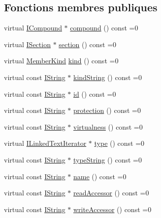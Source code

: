 \subsection*{Fonctions membres publiques}
\begin{DoxyCompactItemize}
\item 
virtual \hyperlink{class_i_compound}{I\+Compound} $\ast$ \hyperlink{class_i_member_adb43a70dd0312813e07b3e6722d397c5}{compound} () const  =0
\item 
virtual \hyperlink{class_i_section}{I\+Section} $\ast$ \hyperlink{class_i_member_a17fa83e7c5446b1ef014a067aeff1681}{section} () const  =0
\item 
virtual \hyperlink{class_i_member_ab486b4d2fdebc7a181e8dd0a09170956}{Member\+Kind} \hyperlink{class_i_member_a954ba2eeed75a5d451f38be19b0f3873}{kind} () const  =0
\item 
virtual const \hyperlink{class_i_string}{I\+String} $\ast$ \hyperlink{class_i_member_a329e8a567d1dc868a496d2502976d843}{kind\+String} () const  =0
\item 
virtual const \hyperlink{class_i_string}{I\+String} $\ast$ \hyperlink{class_i_member_a4f2a1cfb4d4238cef520640daeeb53d7}{id} () const  =0
\item 
virtual const \hyperlink{class_i_string}{I\+String} $\ast$ \hyperlink{class_i_member_abbbeb52ce625f60086ce4ef7082f161f}{protection} () const  =0
\item 
virtual const \hyperlink{class_i_string}{I\+String} $\ast$ \hyperlink{class_i_member_a9f160f10f6951109a51d2c1b4e3a0bb8}{virtualness} () const  =0
\item 
virtual \hyperlink{class_i_linked_text_iterator}{I\+Linked\+Text\+Iterator} $\ast$ \hyperlink{class_i_member_a0d5ed8e2bdcc4e88e3a219ace6b6eaab}{type} () const  =0
\item 
virtual const \hyperlink{class_i_string}{I\+String} $\ast$ \hyperlink{class_i_member_ae73d51cf63fb81e8bd965826637f19b1}{type\+String} () const  =0
\item 
virtual const \hyperlink{class_i_string}{I\+String} $\ast$ \hyperlink{class_i_member_a4f1838f08a055c95e12ce9d7728838ae}{name} () const  =0
\item 
virtual const \hyperlink{class_i_string}{I\+String} $\ast$ \hyperlink{class_i_member_a813586861b788da2fd927c9fbf72c07c}{read\+Accessor} () const  =0
\item 
virtual const \hyperlink{class_i_string}{I\+String} $\ast$ \hyperlink{class_i_member_ab031553ce7d249973df1978813297de9}{write\+Accessor} () const  =0
\item 

\end{DoxyCompactItemize}
